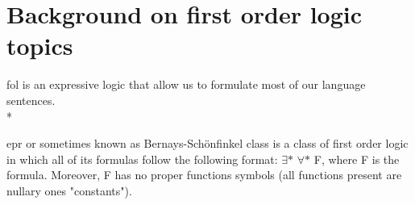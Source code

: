 \section{Background on first order logic topics} \label{sec:c2s1}

\ac{fol} is an expressive logic that allow us to formulate most of our language sentences.\\*

\ac{epr} or sometimes known as Bernays-Schönfinkel class
is a class of first order logic in which all of its formulas follow the following format:
$\exists *$ $\forall *$ F, where F is the formula.
Moreover, F has no proper functions symbols (all functions present are nullary ones "constants").

   